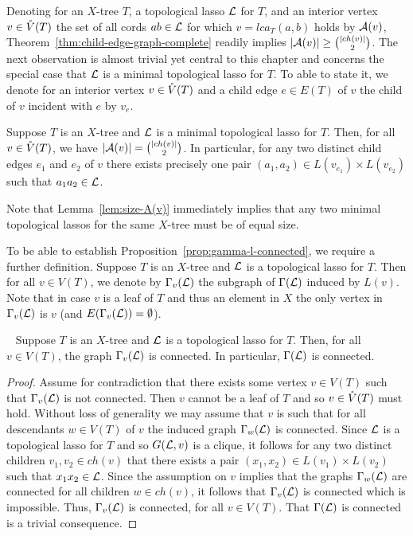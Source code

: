 Denoting for an $X$-tree $T$, a topological lasso ${\mathcal L}$ for $T$, and an
interior vertex $v\in \mathring{V}(T)$ the set of all cords $ab\in {\mathcal L}$ for which
$v=lca_T(a,b)$ holds by ${\mathcal A}(v)$, Theorem~\ref{thm:child-edge-graph-complete}
readily implies $|{\mathcal A}(v)|\geq {|ch(v)|\choose 2}$.  The next observation is
almost trivial yet central to this chapter and concerns the special case that
${\mathcal L}$ is a minimal topological lasso for $T$.  To able to state it, we denote
for an interior vertex $v\in \mathring{V}(T)$ and a child edge $e\in E(T)$ of $v$ the
child of $v$ incident with $e$ by $v_e$.

\begin{lem}\label{lem:size-A(v)}
  Suppose $T$ is an $X$-tree and ${\mathcal L}$ is a minimal topological lasso for
  $T$. Then, for all $v\in \mathring{V}(T)$, we have $|{\mathcal A}(v)|={|ch(v)|\choose 2}$. In
  particular, for any two distinct child edges $e_1$ and $e_2$ of $v$ there
  exists precisely one pair $(a_1,a_2)\in L(v_{e_1})\times L(v_{e_2})$ such
  that $a_1a_2\in{\mathcal L}$.
\end{lem}

Note that Lemma~\ref{lem:size-A(v)} immediately implies that any two minimal
topological lassos for the same $X$-tree must be of equal size.

To be able to establish Proposition~\ref{prop:gamma-l-connected}, we require a
further definition.  Suppose $T$ is an $X$-tree and ${\mathcal L}$ is a topological
lasso for $T$. Then for all $v\in V(T)$, we denote by $\Gamma_v({\mathcal L})$ the
subgraph of $\Gamma({\mathcal L})$ induced by $L(v)$. Note that in case $v$ is a leaf
of $T$ and thus an element in $X$ the only vertex in $\Gamma_v({\mathcal L})$ is $v$
(and $E(\Gamma_v({\mathcal L}))=\emptyset$).

\begin{pro}~\label{prop:gamma-l-connected} Suppose $T$ is an $X$-tree and
  ${\mathcal L}$ is a topological lasso for $T$.  Then, for all $v\in V(T)$, the graph
  $\Gamma_v({\mathcal L})$ is connected.  In particular, $\Gamma({\mathcal L})$ is connected.
\end{pro}
\begin{proof}
  Assume for contradiction that there exists some vertex $v\in V(T)$ such that
  $\Gamma_v({\mathcal L})$ is not connected. Then $v$ cannot be a leaf of $T$ and so
  $v\in \mathring{V}(T)$ must hold. Without loss of generality we may assume that $v$
  is such that for all descendants $w\in V(T)$ of $v$ the induced graph
  $\Gamma_w({\mathcal L})$ is connected. Since ${\mathcal L}$ is a topological lasso for $T$ and
  so $G({\mathcal L},v)$ is a clique, it follows for any two distinct children
  $v_1,v_2\in ch(v)$ that there exists a pair $(x_1,x_2)\in L(v_1)\times
  L(v_2)$ such that $x_1x_2\in {\mathcal L}$.  Since the assumption on $v$ implies that
  the graphs $\Gamma_{w}({\mathcal L})$ are connected for all children $w\in ch(v)$, it
  follows that $\Gamma_v({\mathcal L})$ is connected which is impossible.  Thus,
  $\Gamma_v({\mathcal L})$ is connected, for all $v\in V(T)$.  That $\Gamma({\mathcal L})$ is
  connected is a trivial consequence.  \qquad
\end{proof}

